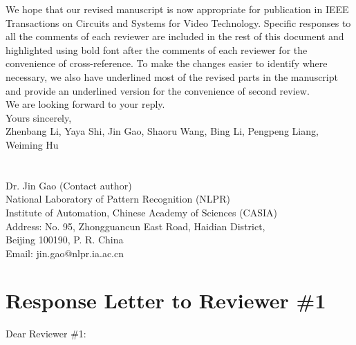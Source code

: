 \documentclass[12pt]{article}
\begin{document}
We hope that our revised manuscript is now appropriate for publication in IEEE Transactions on Circuits and Systems for Video Technology. Specific responses to all the comments of each reviewer are included in the rest of this document and highlighted using bold font after the comments of each reviewer for the convenience of cross-reference. To make the changes easier to identify where necessary, we also have underlined most of the revised parts in the manuscript and provide an underlined version for the convenience of second review.\\[10pt]
\indent We are looking forward to your reply.\\[10pt]
\noindent Yours sincerely,\\
\noindent Zhenbang Li, Yaya Shi, Jin Gao, Shaoru Wang, Bing Li, Pengpeng Liang, Weiming Hu
\\
\\
\\
\noindent Dr. Jin Gao (Contact author)\\
\noindent National Laboratory of Pattern Recognition (NLPR)\\
\noindent Institute of Automation, Chinese Academy of Sciences (CASIA)\\
\noindent Address: No. 95, Zhongguancun East Road, Haidian District,\\
\noindent Beijing 100190, P. R. China\\
\noindent Email: jin.gao@nlpr.ia.ac.cn

\newpage
{\centering\section*{Response Letter to Reviewer \#1}}
\noindent Dear Reviewer \#1:
\end{document}
